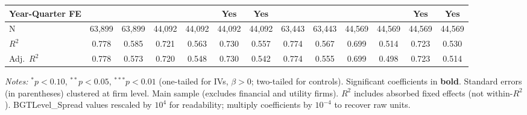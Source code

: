 \begin{landscape}
\begin{table}[H]
\begin{tabular}{lcccccccccccc}
Year-Quarter FE &  &  &  &  & Yes & Yes &  &  &  &  & Yes & Yes \\
\midrule
N & 63,899 & 63,899 & 44,092 & 44,092 & 44,092 & 44,092 & 63,443 & 63,443 & 44,569 & 44,569 & 44,569 & 44,569 \\
$R^2$ & 0.778 & 0.585 & 0.721 & 0.563 & 0.730 & 0.557 & 0.774 & 0.567 & 0.699 & 0.514 & 0.723 & 0.530 \\
Adj.~$R^2$ & 0.778 & 0.573 & 0.720 & 0.548 & 0.730 & 0.542 & 0.774 & 0.555 & 0.699 & 0.498 & 0.723 & 0.514 \\
\bottomrule
\end{tabular}
\begin{minipage}{\linewidth}
\vspace{2pt}\scriptsize
\textit{Notes:} $^{*}p<0.10$, $^{**}p<0.05$, $^{***}p<0.01$ (one-tailed for IVs, $\beta > 0$; two-tailed for controls).
 Significant coefficients in \textbf{bold}.
 Standard errors (in parentheses) clustered at firm level.
 Main sample (excludes financial and utility firms).
 $R^2$ includes absorbed fixed effects (not within-$R^2$).
 BGTLevel\_Spread values rescaled by $10^4$ for readability; multiply coefficients by $10^{-4}$ to recover raw units.
\end{minipage}
\end{table}
\end{landscape}